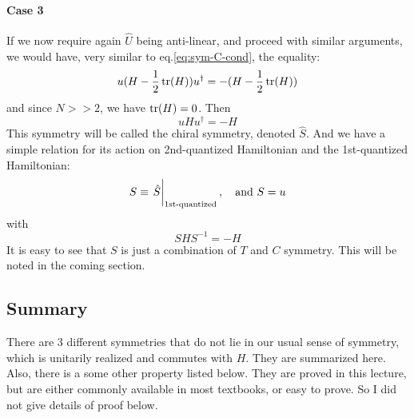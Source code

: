 \documentclass{article}
\begin{document}
\paragraph{Case 3} If we now require again $\hat{U}$ being
anti-linear, and proceed with similar arguments, we would have, very
similar to eq.\ref{eq:sym-C-cond}, the equality: 
\begin{equation}
    \label{eq:sym-S-cond}
    u (H-\frac{1}{2}\tr(H)) u^\dagger = - (H-\frac{1}{2}\tr(H))
\end{equation}
and since $N>>2$, we have $\tr(H)=0$. Then
\begin{equation}
    u H u^\dagger = -H
\end{equation}
This symmetry will be called the chiral symmetry, denoted $\hat{S}$.
And we have a simple relation for its action on 2nd-quantized
Hamiltonian and the 1st-quantized Hamiltonian:
\begin{equation}
    S \equiv \eval{\hat{S}}_{\text{1st-quantized}},\quad
    \text{and}\,\, S = u
\end{equation}
with
\begin{equation}
    S H S^{-1} = -H
\end{equation}
It is easy to see that $S$ is just a combination of $T$ and $C$
symmetry. This will be noted in the coming section.

\subsection{Summary}
\label{sec:Summary}

There are 3 different symmetries that do not lie in our usual sense of
symmetry, which is unitarily realized and commutes with $H$. They are
summarized here. Also, there is a some other property listed below.
They are proved in this lecture, but are either commonly available in
most textbooks, or easy to prove. So I did not give details of proof
below.
\end{document}
